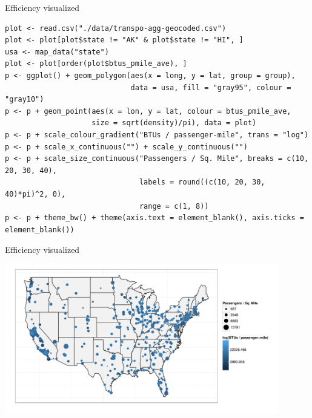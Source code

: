 \documentclass[sans,aspectratio=169,presentation,bigger,fleqn]{beamer}
\begin{document}
\begin{frame}[fragile,label=sec-29]{Efficiency visualized}
 \scriptsize

\begin{verbatim}
plot <- read.csv("./data/transpo-agg-geocoded.csv")
plot <- plot[plot$state != "AK" & plot$state != "HI", ]
usa <- map_data("state")
plot <- plot[order(plot$btus_pmile_ave), ]
p <- ggplot() + geom_polygon(aes(x = long, y = lat, group = group),
                             data = usa, fill = "gray95", colour = "gray10")
p <- p + geom_point(aes(x = lon, y = lat, colour = btus_pmile_ave,
                    size = sqrt(density)/pi), data = plot)
p <- p + scale_colour_gradient("BTUs / passenger-mile", trans = "log")
p <- p + scale_x_continuous("") + scale_y_continuous("")
p <- p + scale_size_continuous("Passengers / Sq. Mile", breaks = c(10, 20, 30, 40),
                               labels = round((c(10, 20, 30, 40)*pi)^2, 0),
                               range = c(1, 8))
p <- p + theme_bw() + theme(axis.text = element_blank(), axis.ticks = element_blank())
\end{verbatim}

\normalsize
\end{frame}
\begin{frame}[label=sec-30]{Efficiency visualized}
\begin{center}
\includegraphics[height=6.5cm]{./img/transpo-plot.pdf}
\end{center}

\normalsize
\end{frame}
\end{document}
